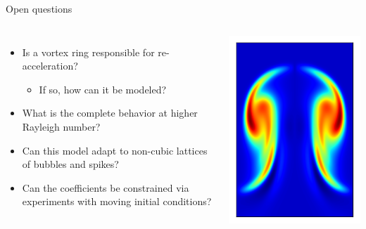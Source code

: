 \documentclass[12pt]{beamer}
\begin{document}
\begin{frame}{Open questions}
\begin{columns}[c] 
\begin{itemize}
  \item Is a vortex ring responsible for re-acceleration?
  \begin{itemize}
    \item If so, how can it be modeled?
  \end{itemize}
  
  \item What is the complete behavior at higher Rayleigh number?

  \item Can this model adapt to non-cubic lattices of bubbles and spikes?

  \item Can the coefficients be constrained via experiments with moving initial conditions?
\end{itemize}

\includegraphics[width=\columnwidth]{graphics/slice_vorticity.png}
\end{columns}
\end{frame}
\end{document}
